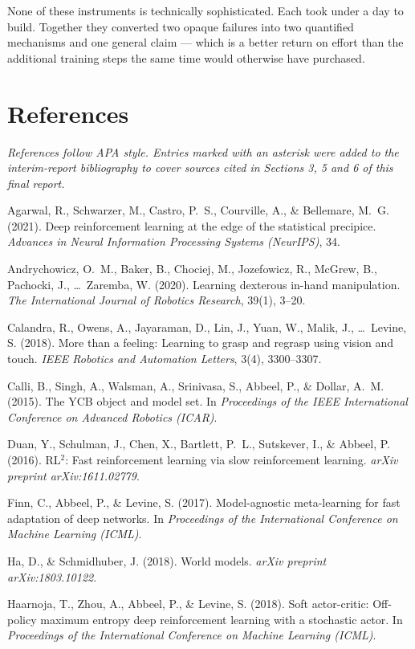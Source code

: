 \documentclass[12pt,a4paper,oneside]{report}
\begin{document}
None of these instruments is technically sophisticated. Each took under a day to
build. Together they converted two opaque failures into two quantified mechanisms
and one general claim --- which is a better return on effort than the additional
training steps the same time would otherwise have purchased.

\newpage

\hypertarget{references}{%
\chapter{References}\label{references}}

\emph{References follow APA style. Entries marked with an asterisk were added
to the interim-report bibliography to cover sources cited in Sections 3,
5 and 6 of this final report.}

Agarwal, R., Schwarzer, M., Castro, P.~S., Courville, A., \& Bellemare, M.~G. (2021). Deep reinforcement learning at the edge of the statistical precipice. \emph{Advances in Neural Information Processing Systems (NeurIPS)}, 34.

Andrychowicz, O.~M., Baker, B., Chociej, M., Jozefowicz, R., McGrew, B., Pachocki, J., \ldots~Zaremba, W. (2020). Learning dexterous in-hand manipulation. \emph{The International Journal of Robotics Research}, 39(1), 3--20.

Calandra, R., Owens, A., Jayaraman, D., Lin, J., Yuan, W., Malik, J., \ldots~Levine, S. (2018). More than a feeling: Learning to grasp and regrasp using vision and touch. \emph{IEEE Robotics and Automation Letters}, 3(4), 3300--3307.

Calli, B., Singh, A., Walsman, A., Srinivasa, S., Abbeel, P., \& Dollar, A.~M. (2015). The YCB object and model set. In \emph{Proceedings of the IEEE International Conference on Advanced Robotics (ICAR)}.

Duan, Y., Schulman, J., Chen, X., Bartlett, P.~L., Sutskever, I., \& Abbeel, P. (2016). RL\(^{2}\): Fast reinforcement learning via slow reinforcement learning. \emph{arXiv preprint arXiv:1611.02779}.

Finn, C., Abbeel, P., \& Levine, S. (2017). Model-agnostic meta-learning for fast adaptation of deep networks. In \emph{Proceedings of the International Conference on Machine Learning (ICML)}.

Ha, D., \& Schmidhuber, J. (2018). World models. \emph{arXiv preprint arXiv:1803.10122}.

Haarnoja, T., Zhou, A., Abbeel, P., \& Levine, S. (2018). Soft actor-critic: Off-policy maximum entropy deep reinforcement learning with a stochastic actor. In \emph{Proceedings of the International Conference on Machine Learning (ICML)}.
\end{document}
